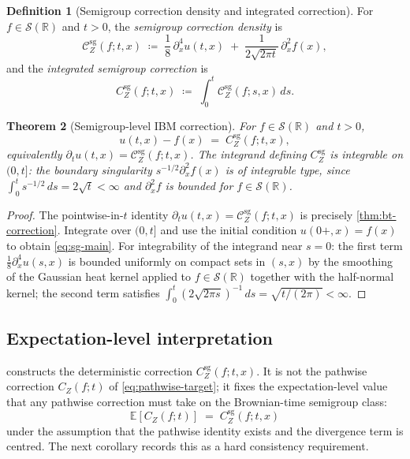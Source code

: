 \documentclass[11pt,reqno]{amsart}
\theoremstyle{plain}
\newtheorem{theorem}{Theorem}[section]
\theoremstyle{definition}
\newtheorem{definition}[theorem]{Definition}
\theoremstyle{remark}
\newcommand{\R}{\mathbb{R}}
\newcommand{\E}{\mathbb{E}}
\newcommand{\IBM}{Z}
\begin{document}
\begin{definition}[Semigroup correction density and integrated correction]
\label{def:sg-correction}
For $f\in\mathscr S(\R)$ and $t>0$, the \emph{semigroup correction
density} is
\begin{equation}\label{eq:sg-density}
  \mathcal C_\IBM^{\mathrm{sg}}(f;t,x)
  \;\coloneqq\;\frac{1}{8}\,\partial_x^{4}u(t,x)
   \;+\;\frac{1}{2\sqrt{2\pi t}}\,\partial_x^{2}f(x),
\end{equation}
and the \emph{integrated semigroup correction} is
\begin{equation}\label{eq:sg-integrated}
  C_\IBM^{\mathrm{sg}}(f;t,x)
  \;\coloneqq\;\int_0^t\mathcal C_\IBM^{\mathrm{sg}}(f;s,x)\,ds.
\end{equation}
\end{definition}

\begin{theorem}[Semigroup-level IBM correction]\label{thm:sg-correction}
For $f\in\mathscr S(\R)$ and $t>0$,
\begin{equation}\label{eq:sg-main}
  u(t,x)-f(x)\;=\;C_\IBM^{\mathrm{sg}}(f;t,x),
\end{equation}
equivalently $\partial_t u(t,x)=\mathcal C_\IBM^{\mathrm{sg}}(f;t,x)$.
The integrand defining $C_\IBM^{\mathrm{sg}}$ is integrable on
$(0,t]$: the boundary singularity
$s^{-1/2}\partial_x^{2}f(x)$ is of integrable type, since
$\int_0^t s^{-1/2}\,ds=2\sqrt t<\infty$ and $\partial_x^{2}f$ is
bounded for $f\in\mathscr S(\R)$.
\end{theorem}

\begin{proof}
The pointwise-in-$t$ identity
$\partial_t u(t,x)=\mathcal C_\IBM^{\mathrm{sg}}(f;t,x)$ is precisely
\cref{thm:bt-correction}. Integrate over $(0,t]$ and use the initial
condition $u(0+,x)=f(x)$ to obtain \eqref{eq:sg-main}. For
integrability of the integrand near $s=0$: the first term
$\tfrac18\partial_x^{4}u(s,x)$ is bounded uniformly on compact sets in
$(s,x)$ by the smoothing of the Gaussian heat kernel applied to
$f\in\mathscr S(\R)$ together with the half-normal kernel; the second
term satisfies $\int_0^{t}(2\sqrt{2\pi s})^{-1}\,ds=\sqrt{t/(2\pi)}<\infty$.
\end{proof}

\subsection*{Expectation-level interpretation}

 constructs the deterministic correction
$C_\IBM^{\mathrm{sg}}(f;t,x)$. It is not the pathwise correction
$C_\IBM(f;t)$ of \eqref{eq:pathwise-target}; it fixes the
expectation-level value that any pathwise correction must take on the
Brownian-time semigroup class:
\[
  \E[C_\IBM(f;t)]\;=\;C_\IBM^{\mathrm{sg}}(f;t,x)
\]
under the assumption that the pathwise identity exists and the
divergence term is centred. The next corollary records this as a
hard consistency requirement.
\end{document}
